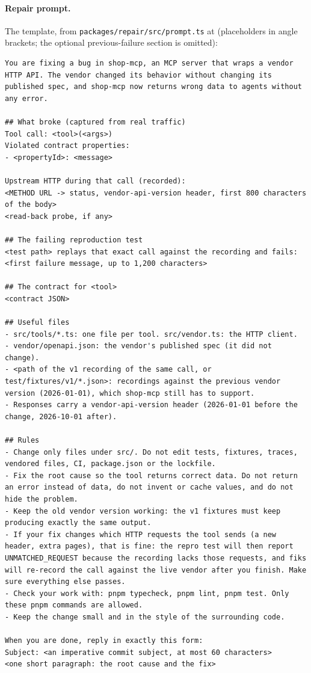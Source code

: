 \documentclass[10pt]{article}
\begin{document}
\paragraph{Repair prompt.} The template, from \texttt{packages/repair/src/prompt.ts} at \texttt{\fiksSha} (placeholders in angle brackets; the optional previous-failure section is omitted):
\begin{lstlisting}
You are fixing a bug in shop-mcp, an MCP server that wraps a vendor HTTP API. The vendor changed its behavior without changing its published spec, and shop-mcp now returns wrong data to agents without any error.

## What broke (captured from real traffic)
Tool call: <tool>(<args>)
Violated contract properties:
- <propertyId>: <message>

Upstream HTTP during that call (recorded):
<METHOD URL -> status, vendor-api-version header, first 800 characters of the body>
<read-back probe, if any>

## The failing reproduction test
<test path> replays that exact call against the recording and fails:
<first failure message, up to 1,200 characters>

## The contract for <tool>
<contract JSON>

## Useful files
- src/tools/*.ts: one file per tool. src/vendor.ts: the HTTP client.
- vendor/openapi.json: the vendor's published spec (it did not change).
- <path of the v1 recording of the same call, or test/fixtures/v1/*.json>: recordings against the previous vendor version (2026-01-01), which shop-mcp still has to support.
- Responses carry a vendor-api-version header (2026-01-01 before the change, 2026-10-01 after).

## Rules
- Change only files under src/. Do not edit tests, fixtures, traces, vendored files, CI, package.json or the lockfile.
- Fix the root cause so the tool returns correct data. Do not return an error instead of data, do not invent or cache values, and do not hide the problem.
- Keep the old vendor version working: the v1 fixtures must keep producing exactly the same output.
- If your fix changes which HTTP requests the tool sends (a new header, extra pages), that is fine: the repro test will then report UNMATCHED_REQUEST because the recording lacks those requests, and fiks will re-record the call against the live vendor after you finish. Make sure everything else passes.
- Check your work with: pnpm typecheck, pnpm lint, pnpm test. Only these pnpm commands are allowed.
- Keep the change small and in the style of the surrounding code.

When you are done, reply in exactly this form:
Subject: <an imperative commit subject, at most 60 characters>
<one short paragraph: the root cause and the fix>
\end{lstlisting}
\end{document}
